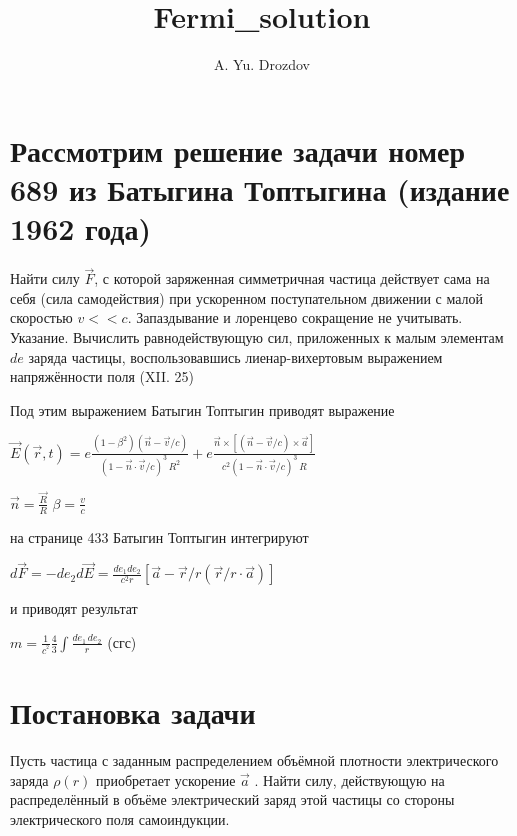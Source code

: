 \documentclass[11pt]{article}
\author{A. Yu. Drozdov}
\title{Fermi\_solution}
\begin{document}
    
    \maketitle
    
    

    
    \section{Рассмотрим решение задачи номер 689 из Батыгина Топтыгина
(издание 1962
года)}\label{ux440ux430ux441ux441ux43cux43eux442ux440ux438ux43c-ux440ux435ux448ux435ux43dux438ux435-ux437ux430ux434ux430ux447ux438-ux43dux43eux43cux435ux440-689-ux438ux437-ux431ux430ux442ux44bux433ux438ux43dux430-ux442ux43eux43fux442ux44bux433ux438ux43dux430-ux438ux437ux434ux430ux43dux438ux435-1962-ux433ux43eux434ux430}

Найти силу \(\vec{F}\), с которой заряженная симметричная частица
действует сама на себя (сила самодействия) при ускоренном поступательном
движении с малой скоростью \(v << c\). Запаздывание и лоренцево
сокращение не учитывать. Указание. Вычислить равнодействующую сил,
приложенных к малым элементам \(de\) заряда частицы, воспользовавшись
лиенар-вихертовым выражением напряжённости поля (XII. 25)

Под этим выражением Батыгин Топтыгин приводят выражение

\(\vec{E}\left(\vec{r},t\right) = e \frac{\left(1-\beta^2\right) \left(\vec{n}-\vec{v}/c \right)}{\left(1-\vec{n}\cdot\vec{v}/c\right)^3\,R^2} + e \frac{ \vec{n} \times \left[ \left( \vec{n}-\vec{v}/c\right) \times \vec{a}\right]}{c^2 \left(1-\vec{n} \cdot \vec{v}/c \right)^3 \,R }\)

\(\vec{n}=\frac{\vec{R}}{R}\) \(\beta=\frac{v}{c}\)

на странице 433 Батыгин Топтыгин интегрируют

\(d\vec{F} = - d e_2 d\vec{E} = \frac{de_1 de_2}{c^2 r} \left[ \vec{a} - \vec{r}/r\left( \vec{r}/r \cdot \vec{a}\right) \right]\)

и приводят результат

\(m =\frac{1}{{{c}^{^{2}}}}\frac{4}{3}\int\frac{de_1\,de_2}{r}\) (сгс)

    \section{Постановка
задачи}\label{ux43fux43eux441ux442ux430ux43dux43eux432ux43aux430-ux437ux430ux434ux430ux447ux438}

Пусть частица с заданным распределением объёмной плотности
электрического заряда \(\rho \left( r \right)\) приобретает ускорение
\(\overrightarrow{a}\) . Найти силу, действующую на распределённый в
объёме электрический заряд этой частицы со стороны электрического поля
самоиндукции.
\end{document}
